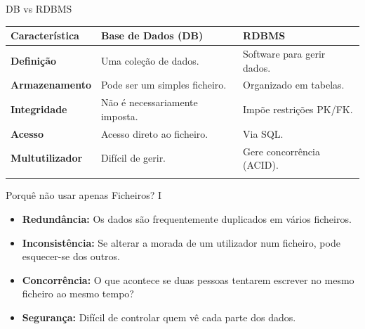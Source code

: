 \documentclass[
  ignorenonframetext,
]{beamer}
\newcounter{none} %
\providecommand{\tightlist}{%
  \setlength{\itemsep}{0pt}\setlength{\parskip}{0pt}}
\begin{document}
\begin{frame}{DB vs RDBMS}
\protect{}\label{db-vs-rdbms}
{\def\LTcaptype{none} %
\begin{longtable}[]{@{}
  >{\raggedright\arraybackslash}p{}
  >{\raggedright\arraybackslash}p{}
  >{\raggedright\arraybackslash}p{}@{}}
\toprule\noalign{}
\begin{minipage}[b]{\linewidth}\raggedright
Característica
\end{minipage} & \begin{minipage}[b]{\linewidth}\raggedright
Base de Dados (DB)
\end{minipage} & \begin{minipage}[b]{\linewidth}\raggedright
RDBMS
\end{minipage} \\
\midrule\noalign{}
\endhead
\textbf{Definição} & Uma coleção de dados. & Software para gerir
dados. \\
\textbf{Armazenamento} & Pode ser um simples ficheiro. & Organizado em
tabelas. \\
\textbf{Integridade} & Não é necessariamente imposta. & Impõe restrições
PK/FK. \\
\textbf{Acesso} & Acesso direto ao ficheiro. & Via SQL. \\
\textbf{Multutilizador} & Difícil de gerir. & Gere concorrência
(ACID). \\
\bottomrule\noalign{}
\end{longtable}
}
\end{frame}

\begin{frame}{Porquê não usar apenas Ficheiros? I}
\protect{}\label{porquuxea-nuxe3o-usar-apenas-ficheiros-i}
\begin{itemize}
\tightlist
\item
  \textbf{Redundância:} Os dados são frequentemente duplicados em vários
  ficheiros.
\item
  \textbf{Inconsistência:} Se alterar a morada de um utilizador num
  ficheiro, pode esquecer-se dos outros.
\item
  \textbf{Concorrência:} O que acontece se duas pessoas tentarem
  escrever no mesmo ficheiro ao mesmo tempo?
\item
  \textbf{Segurança:} Difícil de controlar quem vê cada parte dos dados.
\end{itemize}
\end{frame}
\end{document}
